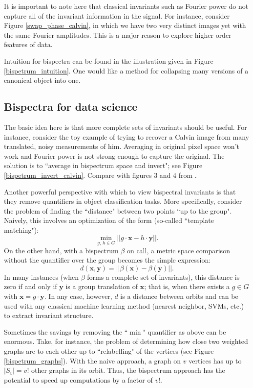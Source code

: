\documentclass[letterpaper, 10pt]{article}
\theoremstyle{definition}
\begin{document}
It is important to note here that classical invariants such as Fourier power do not capture all of the invariant information in the signal.  For instance, consider Figure \ref{swap_phase_calvin}, in which we have two very distinct images yet with the same Fourier amplitudes.
This is a major reason to explore higher-order features of data.

Intuition for bispectra can be found in the illustration given in Figure \ref{bispetrum_intuition}.  One would like a method for collapsing many versions of a canonical object into one.  

\subsection{Bispectra for data science}

The basic idea here is that more complete sets of invariants should be useful.  For instance, consider the toy example of trying to recover a Calvin image from many translated, noisy measurements of him.  Averaging in original pixel space won't work and Fourier power is not strong enough to capture the original.  The solution is to ``average in bispectrum space and invert"; see Figure \ref{bispetrum_invert_calvin}.
Compare with figures 3 and 4 from \cite{sadler89}.

Another powerful perspective with which to view bispectral invariants is that they remove quantifiers in object classification tasks.  More specifically, consider the problem of finding the ``distance" between two points ``up to the group".  Naively, this involves an optimization of the form (so-called ``template matching"):
\[ \min_{g, \,h \in G} || g \cdot \mathbf{x} - h\cdot \mathbf{y}||.\]
On the other hand, with a bispectrum $\beta$ on call, a metric space comparison without the quantifier over the group becomes the simple expression:
\[d(\mathbf{x}, \mathbf{y}) = || \beta(\mathbf{x}) - \beta(\mathbf{y})||.\]
In many instances (when $\beta$ forms a complete set of invariants), this distance is zero if and only if $\mathbf{y}$ is a group translation of $\mathbf{x}$; that is, when there exists a $g \in G$ with $\mathbf{x} = g \cdot \mathbf{y}$.  In any case, however, $d$ is a distance between orbits and can be used with any classical machine learning method (nearest neighbor, SVMs, etc.) to extract invariant structure.

Sometimes the savings by removing the ``$\min$" quantifier as above can be enormous.  Take, for instance, the problem of determining how close two weighted graphs are to each other up to ``relabelling" of the vertices (see Figure \ref{bispetrum_graphs}).  With the naive approach, a graph on $v$ vertices has up to $|S_v| = v!$ other graphs in its orbit.  Thus, the bispectrum approach has the potential to speed up computations by a factor of $v!$.
\end{document}
